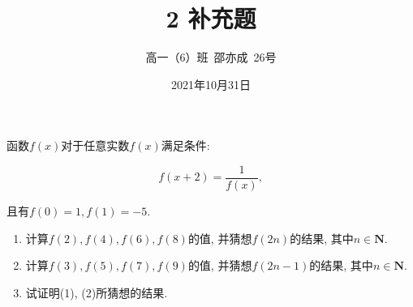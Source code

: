 \documentclass[8pt]{article}
\author{高一（6）班\ 邵亦成\ 26号}
\title{2 补充题}
\date{2021年10月31日}
\begin{document}
	\maketitle

	函数$f(x)$对于任意实数$f(x)$满足条件:

	$$f(x+2)=\frac{1}{f(x)},$$

	且有$f(0)=1, f(1)=-5.$

	\begin{enumerate}[label=(\arabic*)]
		\item 计算$f(2), f(4), f(6), f(8)$的值, 并猜想$f(2n)$的结果, 其中$n \in \mathbf{N}.$
		\item 计算$f(3), f(5), f(7), f(9)$的值, 并猜想$f(2n-1)$的结果, 其中$n \in \mathbf{N}.$
		\item 试证明(1), (2)所猜想的结果.
	\end{enumerate}
	~\\
\end{document}

